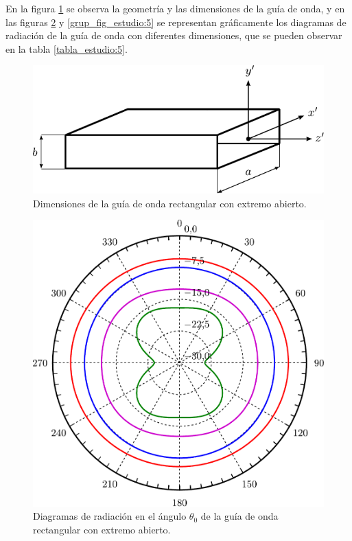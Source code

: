 En la figura \ref{fig_estudio:16} se observa la geometría y las dimensiones de la guía de onda, y en las figuras \ref{fig_estudio:17} y \ref{grup_fig_estudio:5} se representan gráficamente los diagramas de radiación de la guía de onda con diferentes dimensiones, que se pueden observar en la tabla \ref{tabla_estudio:5}.
\begin{figure}[H]
\centering
\includegraphics[scale = 1]{Figures/Estudio/estudio_16}
\caption{Dimensiones de la guía de onda rectangular con extremo abierto.}
\label{fig_estudio:16}
\end{figure}
\begin{figure}[H]
\centering
\includegraphics[scale = 0.5]{Figures/Estudio/estudio_17}
\caption{Diagramas de radiación en el ángulo $\theta_0$ de la guía de onda rectangular con extremo abierto.}
\label{fig_estudio:17}
\end{figure}
